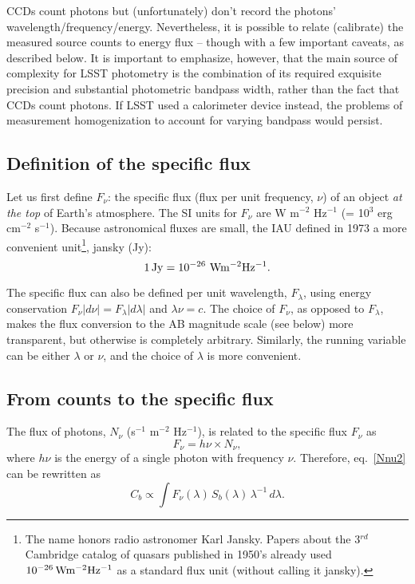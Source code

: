 \documentclass[DM,lsstdraft,toc,usenatbib]{lsstdoc}
\begin{document}
CCDs count photons but (unfortunately) don't record the photons' wavelength/frequency/energy.
Nevertheless, it is possible to relate (calibrate) the measured source counts to energy flux -- though
with a few important caveats, as described below. It is important to emphasize, however, that the main 
source of complexity for LSST photometry is the combination of its required exquisite precision
and substantial photometric bandpass width, rather than the fact that CCDs count photons. If LSST
used a calorimeter device instead, the problems of measurement homogenization to account for varying 
bandpass would persist. 

 

\subsection{Definition of the specific flux} 

Let us first  define $F_\nu$: the specific flux (flux per unit frequency, $\nu$) of an 
object {\it at the top} of Earth's atmosphere. The SI units for $F_\nu$ are 
W m$^{-2}$ Hz$^{-1}$ (= 10$^{3}$ erg cm$^{-2}$ s$^{-1}$). Because astronomical 
fluxes are small, the IAU defined in 1973 a more convenient unit\footnote{The
name honors radio astronomer Karl Jansky. Papers about the 3$^{rd}$ Cambridge 
catalog of quasars published in 1950's already used $10^{-26} \, {\rm W m^{-2} Hz^{-1}}$
as a standard flux unit (without calling it jansky).},  jansky (Jy): 
\begin{equation}
            1 \, {\rm Jy} = 10^{-26} \,\, {\rm W m^{-2} Hz^{-1}}.
\end{equation} 

The specific flux can also be defined per unit wavelength, $F_\lambda$, using energy 
conservation $F_\nu |d\nu|=F_\lambda |d\lambda|$ and $\lambda \nu = c$.
The choice of $F_\nu$, as opposed to $F_\lambda$, makes the flux conversion 
to the AB magnitude scale (see below) more transparent, but otherwise is completely
arbitrary. Similarly, the running variable can be either  $\lambda$ or $\nu$, and the 
choice of $\lambda$ is more convenient.



\subsection{From counts to the specific flux} 

The flux of photons, $N_\nu$ (s$^{-1}$ m$^{-2}$ Hz$^{-1}$), is related to the specific flux $F_\nu$ as
\begin{equation}
\label{FNnu}
                 F_\nu = h \nu \times N_\nu,  
\end{equation}
where $h\nu$ is the energy of a single photon with frequency $\nu$. Therefore,
eq.~\ref{Nnu2} can be rewritten as
\begin{equation}
\label{Nnu3}
         C_b\propto \int F_\nu(\lambda) \, S_b(\lambda) \, \lambda^{-1} \, d\lambda. 
\end{equation}
\end{document}
